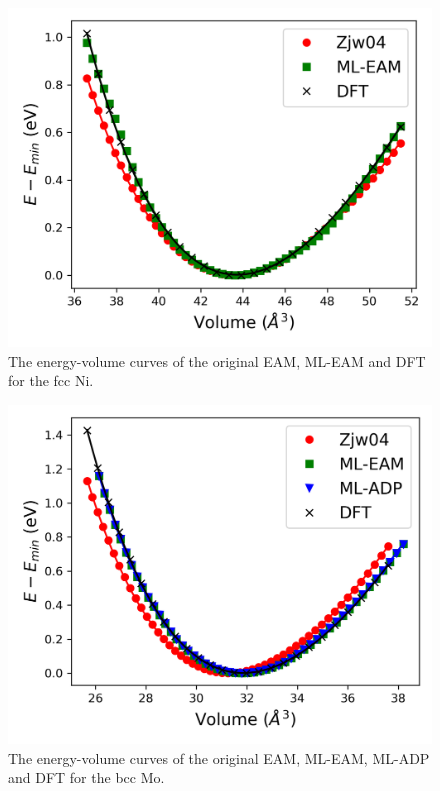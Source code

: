 \documentclass[final,3p,times]{elsarticle}
\begin{document}
% 
%
\begin{figure}
\centering
\includegraphics[scale=0.65]{Ni_all_eos.png}
\caption{\label{fig:Ni_eos} The energy-volume curves of the original EAM, 
ML-EAM and DFT for the fcc Ni.}
\end{figure}

% 
%
\begin{figure}
\centering
\includegraphics[scale=0.65]{Mo_all_eos.png}
\caption{\label{fig:Mo_eos} The energy-volume curves of the original EAM, 
ML-EAM, ML-ADP and DFT for the bcc Mo.}
\end{figure}
\end{document}
